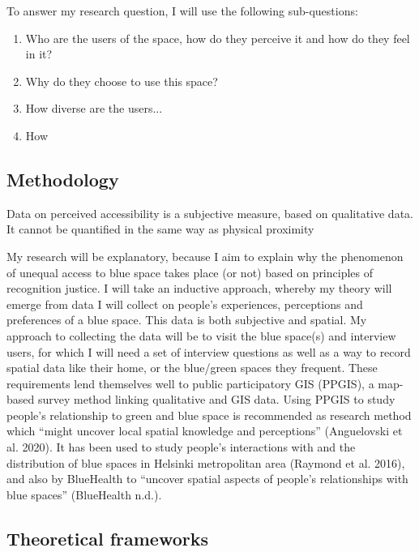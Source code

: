 \documentclass{article}
\begin{document}
To answer my research question, I will use the following sub-questions:

\begin{enumerate}
	\item Who are the users of the space, how do they perceive it and how do they feel in it?
	\item Why do they choose to use this space?
	\item How diverse are the users... 
	\item How 
\end{enumerate}

\subsection{Methodology}

Data on perceived accessibility is a subjective measure, based on qualitative data. It cannot be quantified in the same way as physical proximity

My research will be explanatory, because I aim to explain why the phenomenon of unequal access to blue space takes place (or not) based on principles of recognition justice. I will take an inductive approach, whereby my theory will emerge from data I will collect on people’s experiences, perceptions and preferences of a blue space. This data is both subjective and spatial. My approach to collecting the data will be to visit the blue space(s) and interview users, for which I will need a set of interview questions as well as a way to record spatial data like their home, or the blue/green spaces they frequent. These requirements lend themselves well to public participatory GIS (PPGIS), a map-based survey method linking qualitative and GIS data. Using PPGIS to study people’s relationship to green and blue space is recommended as research method which “might uncover local spatial knowledge and perceptions” (Anguelovski et al. 2020). It has been used to study people’s interactions with and the distribution of blue spaces in Helsinki metropolitan area (Raymond et al. 2016), and also by BlueHealth to “uncover spatial aspects of people’s relationships with blue spaces” (BlueHealth n.d.).


\subsection{Theoretical frameworks}
\end{document}
